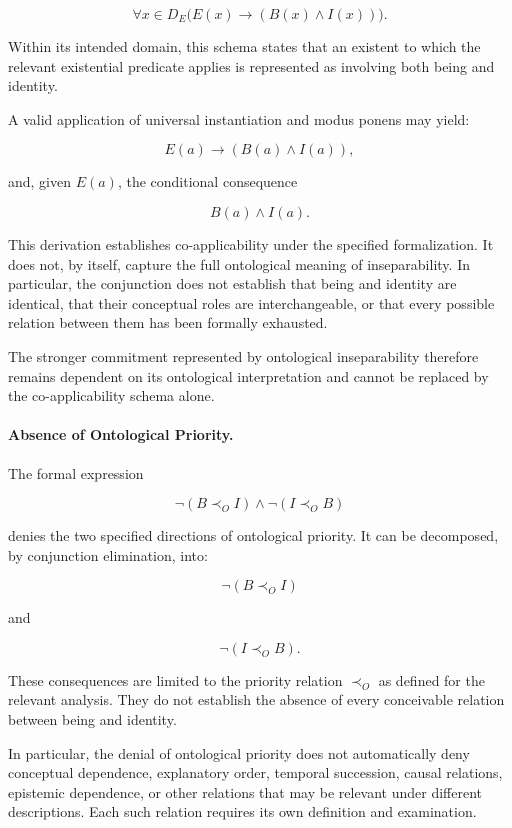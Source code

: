 \[
    \forall x \in D_E
    \bigl(E(x) \rightarrow (B(x) \land I(x))\bigr).
\]

Within its intended domain, this schema states that an existent
to which the relevant existential predicate applies is represented
as involving both being and identity.

A valid application of universal instantiation and modus ponens
may yield:

\[
    E(a) \rightarrow (B(a) \land I(a)),
\]

and, given \(E(a)\), the conditional consequence

\[
    B(a) \land I(a).
\]

This derivation establishes co-applicability under the specified
formalization. It does not, by itself, capture the full ontological
meaning of inseparability. In particular, the conjunction does
not establish that being and identity are identical, that their
conceptual roles are interchangeable, or that every possible
relation between them has been formally exhausted.

The stronger commitment represented by ontological inseparability
therefore remains dependent on its ontological interpretation and
cannot be replaced by the co-applicability schema alone.

\paragraph{Absence of Ontological Priority.}

The formal expression

\[
    \neg(B \prec_O I)
    \land
    \neg(I \prec_O B)
\]

denies the two specified directions of ontological priority.
It can be decomposed, by conjunction elimination, into:

\[
    \neg(B \prec_O I)
\]

and

\[
    \neg(I \prec_O B).
\]

These consequences are limited to the priority relation
\(\prec_O\) as defined for the relevant analysis. They do not
establish the absence of every conceivable relation between
being and identity.

In particular, the denial of ontological priority does not
automatically deny conceptual dependence, explanatory order,
temporal succession, causal relations, epistemic dependence, or
other relations that may be relevant under different descriptions.
Each such relation requires its own definition and examination.

